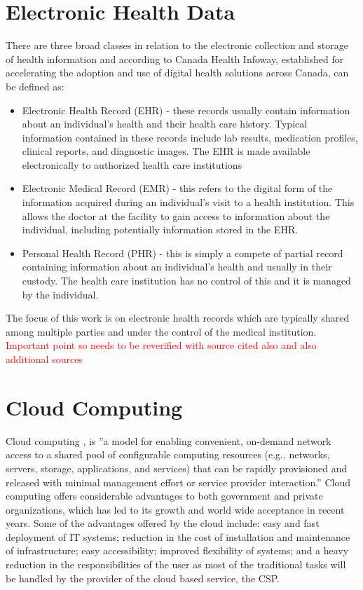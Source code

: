 \section{Electronic Health Data}

There are three broad classes in relation to the electronic collection and storage of health information and according to Canada Health Infoway, established for accelerating the adoption and use of digital health solutions across Canada, can be defined as:

\begin{itemize}
	
	\item Electronic Health Record (EHR)\cite{caninfoway} - these records usually contain information about an individual's health and their health care history. Typical information contained in these records include lab results, medication profiles, clinical reports, and diagnostic images. The EHR is made available electronically to authorized health care institutions
	
	\item Electronic Medical Record (EMR)\cite{caninfoway} - this refers to the digital form of the information acquired during an individual's visit to a health institution. This allows the doctor at the facility to gain access to information about the individual, including potentially information stored in the EHR.
	
	\item Personal Health Record (PHR)\cite{caninfoway} - this is simply a compete of partial record containing information about an individual's health and usually in their custody. The health care institution has no control of this and it is managed by the individual.
	
\end{itemize}

The focus of this work is on electronic health records which are typically shared among multiple parties and under the control of the medical institution. \textcolor{red}{Important point so needs to be reverified with source cited also and also additional sources}

\section{Cloud Computing}

Cloud computing \cite{nist}, is ''a model for enabling convenient, on-demand network access to a shared pool of configurable computing resources (e.g., networks, servers, storage, applications, and services) that can be rapidly provisioned and released with minimal management effort or service provider interaction.'' Cloud computing offers considerable advantages to both government and private organizations, which has led to its growth and world wide acceptance in recent years. Some of the advantages offered by the cloud include: easy and fast deployment of IT systems; reduction in the cost of installation and maintenance of infrastructure; easy accessibility; improved flexibility of systems; and a heavy reduction in the responsibilities of the user as most of the traditional tasks will be handled by the provider of the cloud based service, the CSP.

